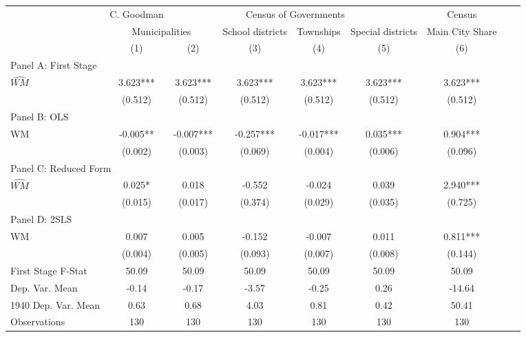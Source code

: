  \begin{tabular}{l*{8}{c}} \toprule
&\multicolumn{1}{c}{C. Goodman}&\multicolumn{4}{c}{Census of Governments}&\multicolumn{1}{c}{Census}\\\cmidrule(lr){2-2}\cmidrule(lr){3-6}\cmidrule(lr){7-7}
&\multicolumn{2}{c}{Municipalities}&\multicolumn{1}{c}{School districts}&\multicolumn{1}{c}{Townships}&\multicolumn{1}{c}{Special districts}&\multicolumn{1}{c}{Main City Share}\\\cmidrule(lr){2-3}\cmidrule(lr){4-6}\cmidrule(lr){7-7}
&\multicolumn{1}{c}{(1)}&\multicolumn{1}{c}{(2)}&\multicolumn{1}{c}{(3)}&\multicolumn{1}{c}{(4)}&\multicolumn{1}{c}{(5)}&\multicolumn{1}{c}{(6)}\\
\cmidrule(lr){1-7}
\multicolumn{6}{l}{Panel A: First Stage}\\
\cmidrule(lr){1-7}
$\widehat{WM}$  &    3.623***&    3.623***&    3.623***&    3.623***&    3.623***&    3.623***\\
                &  (0.512)   &  (0.512)   &  (0.512)   &  (0.512)   &  (0.512)   &  (0.512)   \\
\cmidrule(lr){1-7}
\multicolumn{6}{l}{Panel B: OLS}\\
\cmidrule(lr){1-7}
WM              &   -0.005** &   -0.007***&   -0.257***&   -0.017***&    0.035***&    0.904***\\
                &  (0.002)   &  (0.003)   &  (0.069)   &  (0.004)   &  (0.006)   &  (0.096)   \\
\cmidrule(lr){1-7}
\multicolumn{6}{l}{Panel C: Reduced Form}\\
\cmidrule(lr){1-7}
$\widehat{WM}$  &    0.025*  &    0.018   &   -0.552   &   -0.024   &    0.039   &    2.940***\\
                &  (0.015)   &  (0.017)   &  (0.374)   &  (0.029)   &  (0.035)   &  (0.725)   \\
\cmidrule(lr){1-7}
\multicolumn{6}{l}{Panel D: 2SLS}\\
\cmidrule(lr){1-7}
WM              &    0.007   &    0.005   &   -0.152   &   -0.007   &    0.011   &    0.811***\\
                &  (0.004)   &  (0.005)   &  (0.093)   &  (0.007)   &  (0.008)   &  (0.144)   \\
\midrule
First Stage F-Stat&    50.09   &    50.09   &    50.09   &    50.09   &    50.09   &    50.09   \\
Dep. Var. Mean  &    -0.14   &    -0.17   &    -3.57   &    -0.25   &     0.26   &   -14.64   \\
1940 Dep. Var. Mean&     0.63   &     0.68   &     4.03   &     0.81   &     0.42   &    50.41   \\
Observations    &      130   &      130   &      130   &      130   &      130   &      130   \\
       \bottomrule \end{tabular}
